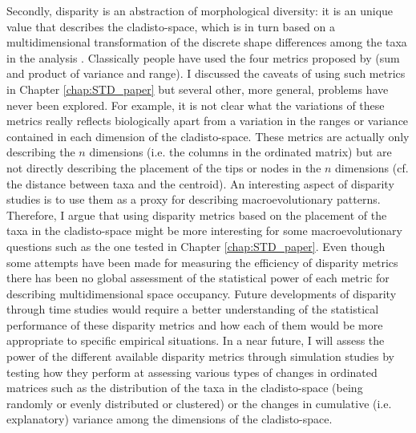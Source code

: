Secondly, disparity is an abstraction of morphological diversity: it is an unique value that describes the cladisto-space, which is in turn based on a multidimensional transformation of the discrete shape differences among the taxa in the analysis \citep{Wills1994,foote1997evolution}.
Classically people have used the four metrics proposed by \cite{Wills1994} (sum and product of variance and range).
I discussed the caveats of using such metrics in Chapter \ref{chap:STD_paper} but several other, more general, problems have never been explored.
For example, it is not clear what the variations of these metrics really reflects biologically apart from a variation in the ranges or variance contained in each dimension of the cladisto-space.
These metrics are actually only describing the $n$ dimensions (i.e. the columns in the ordinated matrix) but are not directly describing the placement of the tips or nodes in the $n$ dimensions (cf. the distance between taxa and the centroid).
An interesting aspect of disparity studies is to use them as a proxy for describing macroevolutionary patterns.%
Therefore, I argue that using disparity metrics based on the placement of the taxa in the cladisto-space might be more interesting for some macroevolutionary questions such as the one tested in Chapter \ref{chap:STD_paper}.
Even though some attempts have been made for measuring the efficiency of disparity metrics \citep{Ciampaglio2001} there has been no global assessment of the statistical power of each metric for describing multidimensional space occupancy.
Future developments of disparity through time studies would require a better understanding of the statistical performance of these disparity metrics and how each of them would be more appropriate to specific empirical situations.
In a near future, I will assess the power of the different available disparity metrics \citep[e.g.][]{Wills1994,Ciampaglio2004,Hughes20082013,huang2015origins} through simulation studies by testing how they perform at assessing various types of changes in ordinated matrices such as the distribution of the taxa in the cladisto-space (being randomly or evenly distributed or clustered) or the changes in cumulative (i.e. explanatory) variance among the dimensions of the cladisto-space.

